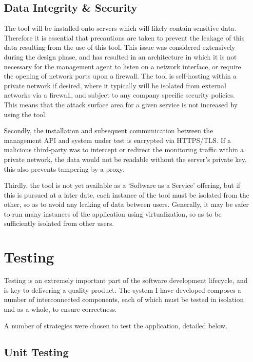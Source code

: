 \documentclass{cshonours}
\begin{document}
\section{Data Integrity \& Security}
    The tool will be installed onto servers which will likely contain sensitive data. Therefore it is essential that precautions are taken to prevent the leakage of this data resulting from the use of this tool. This issue was considered extensively during the design phase, and has resulted in an architecture in which it is not necessary for the management agent to listen on a network interface, or require the opening of network ports upon a firewall. The tool is self-hosting within a private network if desired, where it typically will be isolated from external networks via a firewall, and subject to any company specific security policies. This means that the attack surface area for a given service is not increased by using the tool.

    Secondly, the installation and subsequent communication between the management API and system under test is encrypted via HTTPS/TLS\@. If a malicious third-party was to intercept or redirect the monitoring traffic within a private network, the data would not be readable without the server's private key, this also prevents tampering by a proxy.

    Thirdly, the tool is not yet available as a `Software as a Service' offering, but if this is pursued at a later date, each instance of the tool must be isolated from the other, so as to avoid any leaking of data between users. Generally, it may be safer to run many instances of the application using virtualization, so as to be sufficiently isolated from other users.

\chapter{Testing}

Testing is an extremely important part of the software development lifecycle, and is key to delivering a quality product. The system I have developed composes a number of interconnected components, each of which must be tested in isolation and as a whole, to ensure correctness.

A number of strategies were chosen to test the application, detailed below.

\section{Unit Testing}
\end{document}
